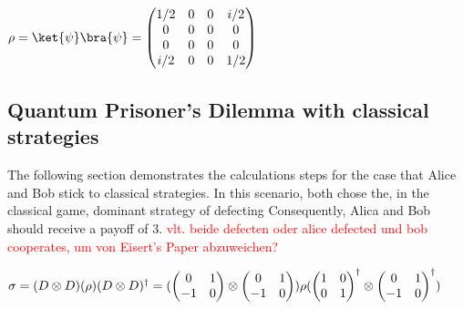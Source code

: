 $\rho=\ket{\psi}\bra{\psi}=\begin{pmatrix}1/2&0&0&i/2\\0&0&0&0\\0&0&0&0\\i/2&0&0&1/2\end{pmatrix}$


\subsection{Quantum Prisoner's Dilemma with classical strategies}

The following section demonstrates the calculations steps for the case that Alice and Bob stick to classical strategies. In this scenario, both chose the, in the classical game, dominant strategy of defecting Consequently, Alica and Bob should receive a payoff of $3$.
\textcolor{red}{vlt. beide defecten oder alice defected und bob cooperates, um von Eisert's Paper abzuweichen?}

$\sigma=(D\otimes D)(\rho)(D\otimes D)^\dagger\\
=(\begin{pmatrix}0&1\\-1&0\end{pmatrix}\otimes\begin{pmatrix}0&1\\-1&0\end{pmatrix})\rho(\begin{pmatrix}1&0\\0&1\end{pmatrix}^\dagger\otimes\begin{pmatrix}0&1\\-1&0\end{pmatrix}^\dagger)$


